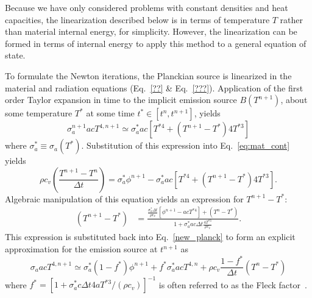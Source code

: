 Because we have only considered problems with constant densities and heat capacities, the
linearization described below is in terms of temperature $T$ rather than material internal
energy, for simplicity. However, the linearization can be formed in terms of internal energy
to apply this method to a general equation of state.

To formulate the Newton iterations, the Planckian source is linearized in the material and radiation equations (Eq.~\eqref{??}
\& Eq.~\eqref{???}).
Application of the first order Taylor expansion in time to the
implicit emission source $B(T^{n+1})$, about some temperature $T^*$ at some
time $t^*\in[t^{n},t^{n+1}]$, yields
\begin{equation}\label{new_planck}
    \sigma_a^{n+1} a c T^{4,n+1} \simeq \sigma_a^* a c \left[T^{*4} + (T^{n+1} - T^*) 4T^{*3} \right]
\end{equation}
where $\sigma_a^*\equiv\sigma_a(T^*)$.  Substitution of this expression into Eq.~\eqref{eq:mat_cont} yields
\begin{equation}
    \rho c_v \left( \frac{T^{n+1} - T^{n}}{\Delta t} \right) = \sigma_a^* \phi^{n+1} -
    \sigma_a^* a c \left[ T^{*4} +  (T^{n+1} - T^*) 4T^{*3} \right].
\end{equation}
Algebraic manipulation of this equation yields an expression for $T^{n+1} - T^{*}$:
\begin{align*}
\left( T^{n+1} - T^* \right) &= \frac{ {\displaystyle \frac{\sigma_a^* \Delta t}{\rho
c_v}}  \left[ \phi^{n+1} -  a c T^{*4} \right] + (T^n - T^*) }{1 +
        \sigma_a^* a c \Delta t\frac{\displaystyle 4
T^{*3}}{\displaystyle \rho c_v } }.
\end{align*}
This expression is substituted back into Eq.~\eqref{new_planck} to form
an explicit approximation for the emission source at $t^{n+1}$ as
\begin{equation}\label{t_next1}
    \sigma_a a c T^{4,n+1} \simeq \sigma_a^* (1 -f^*) \phi^{n+1}
    + f^* \sigma_a^* a c T^{4,n} + \rho c_v\frac{1-f^*}{\Delta t} (T^n - T^*)
\end{equation}
where $f^* = [1 + \sigma_a^* c \Delta t 4 a T^{*3}/(\rho c_v)]^{-1}$ is often referred to
as the Fleck factor~\cite{fnc}. 

